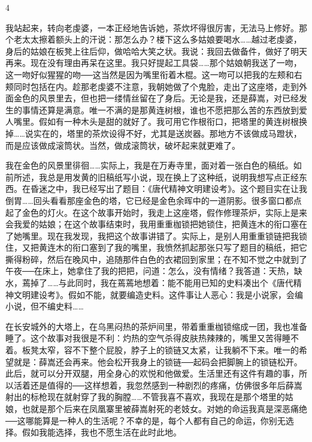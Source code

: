 4 

我站起来，转向老虔婆，一本正经地告诉她，茶炊坏得很厉害，无法马上修好。那个老太太擦着额头上的汗说：那怎么办？楼下这么多姑娘要喝水……越过老虔婆，身后的姑娘在板凳上往后仰，做哈哈大笑之状。我说：我回去做备件，做好了明天再来。现在没有理由再呆在这里。我只好提起工具袋……那个姑娘朝我送了一吻，这一吻好似猩猩的吻──这当然是因为嘴里衔着木棍。这一吻可以把我的左颊和右颊同时包括在内。趁那老虔婆不注意，我朝她做了个鬼脸，走出了这座塔，走到外面金色的风景里去，但也把一缕情丝留在了身后。无论是我，还是薛嵩，对已经发生的事情还算是满意。唯一不满的是那黄连树根，谁也不愿把那么苦的东西放到爱人嘴里。假如有一种木头是甜的就好了。我可用它作根衔口，把塔里的黄连树根换掉……说实在的，塔里的茶炊设得不好，尤其是送炭器。那地方不该做成马蹬状，而是应该做成滚筒状。当然，做成滚筒状，破坏起来就更难了。 

我在金色的风景里徘徊……实际上，我是在万寿寺里，面对着一张白色的稿纸。如前所述，我总是用发黄的旧稿纸写小说，现在换上了这种纸，说明我想写点正经东西。在昏迷之中，我已经写出了题目：《唐代精神文明建设考》。这个题目实在让我倒胃……回头看看那座金色的塔，它已经是金色余晖中的一道阴影。很多窗口都点起了金色的灯火。在这个故事开始时，我走上这座塔，假作修理茶炉，实际上是来会我爱的姑娘；在这个故事结束时，我用重重枷锁把她锁住，把黄连木的衔口塞在了她嘴里。现在我发现，我把这个故事讲错了。实际上，是别人用重重锁链把我锁住，又把黄连木的衔口塞到了我的嘴里，我愤然抓起那张只写了题目的稿纸，把它撕得粉碎，然后在晚风中，追随那件白色的衣裙回到家里；在不知不觉之中就到了午夜──在床上，她拿住了我的把把，问道：怎么，没有情绪？我答道：天热，缺水，蔫掉了……与此同时，我在蔫蔫地想着：能不能用已知的史料凑出个《唐代精神文明建设考》。假如不能，就要编造史料。这件事让人恶心：我是小说家，会编小说，但不编史料…… 

在长安城外的大塔上，在乌黑闷热的茶炉间里，带着重重枷锁缩成一团，我也准备睡了。这个故事对我很是不利：灼热的空气杀得皮肤热辣辣的，嘴里又苦得睡不着。板凳太窄，容不下整个屁股，脖子上的锁链又太紧，让我躺不下来。唯一的希望就是：薛嵩还会再来。他会松开我身上的锁链──起码会把脚腕上的锁链松开。此后，就可以分开双腿，用全身心的欢悦和他做爱。生活里还有这件有趣的事，所以活着还是值得的──这样想着，我忽然感到一种剧烈的疼痛，仿佛很多年后薛嵩射出的标枪现在就射穿了我的胸膛……不管我喜不喜欢，我现在是那个塔里的姑娘，也就是那个后来在凤凰寨里被薛嵩射死的老妓女。对她的命运我真是深恶痛绝──这哪能算是一种人的生活呢？不幸的是，每个人都有自己的命运，你别无选择。假如我能选择，我也不愿生活在此时此地。 

